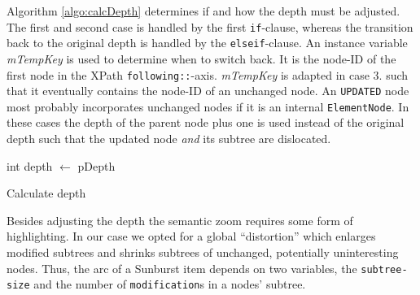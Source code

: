 Algorithm \ref{algo:calcDepth} determines if and how the depth must be adjusted. The first and second case is handled by the first \texttt{if}-clause, whereas the transition back to the original depth is handled by the \texttt{elseif}-clause. An instance variable \emph{mTempKey} is used to determine when to switch back. It is the node-ID of the first node in the XPath \texttt{following::}-axis. \emph{mTempKey} is adapted in case 3. such that it eventually contains the node-ID of an unchanged node. An \texttt{UPDATED} node most probably incorporates unchanged nodes if it is an internal \texttt{ElementNode}. In these cases the depth of the parent node plus one is used instead of the original depth such that the updated node \emph{and} its subtree are dislocated.

\begin{algorithm}[tb]
{}
\BlankLine
int depth $\leftarrow$ pDepth\;
\caption{Calculate depth}\label{algo:calcDepth}
\end{algorithm}

Besides adjusting the depth the semantic zoom requires some form of highlighting. In our case we opted for a global ``distortion'' which enlarges modified subtrees and shrinks subtrees of unchanged, potentially uninteresting nodes. Thus, the arc of a Sunburst item depends on two variables, the \texttt{subtree-size} and the number of \texttt{modification}s in a nodes' subtree.

